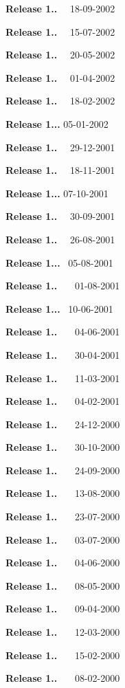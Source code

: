 \begin{DoxyItemize}
\item {\bfseries{Release 1..}}~~ 18-\/09-\/2002 
\item {\bfseries{Release 1..}}~~ 15-\/07-\/2002 
\item {\bfseries{Release 1..}}~~ 20-\/05-\/2002 
\item {\bfseries{Release 1..}}~~ 01-\/04-\/2002 
\item {\bfseries{Release 1..}}~~ 18-\/02-\/2002 
\item {\bfseries{Release 1...}} 05-\/01-\/2002 
\item {\bfseries{Release 1..}}~~ 29-\/12-\/2001 
\item {\bfseries{Release 1..}}~~ 18-\/11-\/2001 
\item {\bfseries{Release 1...}} 07-\/10-\/2001 
\item {\bfseries{Release 1..}}~~ 30-\/09-\/2001 
\item {\bfseries{Release 1..}}~~ 26-\/08-\/2001 
\item {\bfseries{Release 1...}}~ 05-\/08-\/2001 
\item {\bfseries{Release 1..}}~~~ 01-\/08-\/2001 
\item {\bfseries{Release 1...}}~ 10-\/06-\/2001 
\item {\bfseries{Release 1..}}~~~ 04-\/06-\/2001 
\item {\bfseries{Release 1..}}~~~ 30-\/04-\/2001 
\item {\bfseries{Release 1..}}~~~ 11-\/03-\/2001 
\item {\bfseries{Release 1..}}~~~ 04-\/02-\/2001 
\item {\bfseries{Release 1..}}~~~ 24-\/12-\/2000 
\item {\bfseries{Release 1..}}~~~ 30-\/10-\/2000 
\item {\bfseries{Release 1..}}~~~ 24-\/09-\/2000 
\item {\bfseries{Release 1..}}~~~ 13-\/08-\/2000 
\item {\bfseries{Release 1..}}~~~ 23-\/07-\/2000 
\item {}
 
\item {\bfseries{Release 1..}}~~~ 03-\/07-\/2000 
\item {\bfseries{Release 1..}}~~~ 04-\/06-\/2000 
\item {\bfseries{Release 1..}}~~~ 08-\/05-\/2000 
\item {\bfseries{Release 1..}}~~~ 09-\/04-\/2000 
\item {\bfseries{Release 1..}}~~~ 12-\/03-\/2000 
\item {\bfseries{Release 1..}}~~~ 15-\/02-\/2000 
\item {\bfseries{Release 1..}}~~~ 08-\/02-\/2000 
\end{DoxyItemize}
 